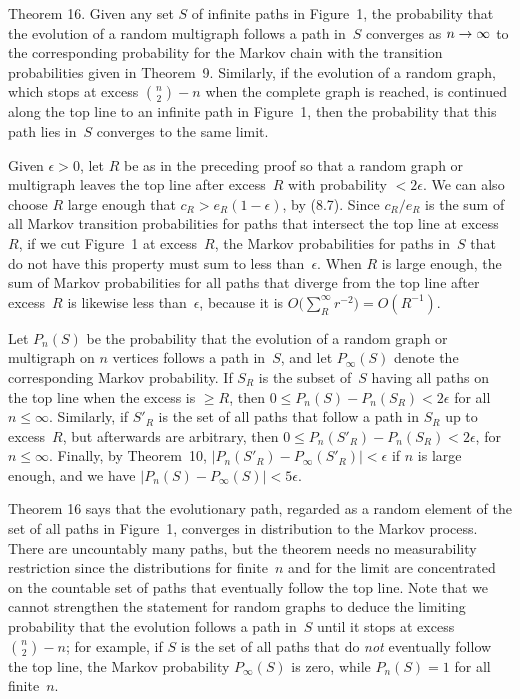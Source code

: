 \proclaim
Theorem 16.
Given any set $S$ of infinite paths in Figure~1, the probability that
the evolution of a random multigraph follows a path in~$S$ converges
as $n\rightarrow\infty$ to the corresponding probability for the Markov chain
with the transition probabilities given in Theorem~9.
Similarly, if the evolution of a random graph, which stops at excess
${n\choose2}-n$ when the complete graph is reached, is continued along
the top line to an infinite path in Figure~1, then the probability that
this path lies in~$S$ converges to the same limit.

\proof
Given $\epsilon >0$, let $R$ be as in the preceding proof so that a random
graph or multigraph leaves the top line after excess~$R$ with probability
$<2\epsilon$. We can also choose $R$ large enough that
$c_R>e_R(1-\epsilon)$, by (8.7). Since $c_R/e_R$ is the sum of all
Markov transition probabilities for paths that intersect the top line
at excess~$R$, if we cut Figure~1 at excess~$R$, the Markov
probabilities for paths in~$S$ that do not have this property must sum
to less than~$\epsilon$. When $R$ is large enough, the sum of Markov
probabilities for all paths that diverge from the top line after
excess~$R$ is likewise less than~$\epsilon$, because it
is $O\bigl(\sum_R^\infty r^{-2}\bigr)=O(R^{-1})$.

Let $P_n(S)$ be the probability that the evolution of a random graph or
multigraph on $n$ vertices follows a path in~$S$, and let $P_\infty(S)$
denote the corresponding Markov probability.
If $S_R$ is the subset of~$S$ having all paths on the top line
when the excess is $\geq R$, then $0\le P_n(S)-P_n(S_R)<2\epsilon$ for
all $n\le\infty$. Similarly, if $S'_R$ is the set of all paths that
follow a path in $S_R$ up to excess~$R$, but afterwards are arbitrary,
then $0\le P_n(S'_R)-P_n(S_R)<2\epsilon$, for $n\le\infty$.
Finally, by Theorem~10, $\bigl\vert P_n(S'_R)-P_\infty(S'_R)\bigr\vert
<\epsilon$ if $n$ is large enough, and we have
$\bigl\vert P_n(S)-P_\infty(S)\bigr\vert<5\epsilon$.\quad\pfbox

\medskip
Theorem 16 says that the evolutionary path, regarded as a random
element of the set of
all paths in Figure~1, converges in distribution to the Markov
process. There are uncountably many paths, but the theorem needs no
measurability restriction since the distributions for finite~$n$ and
for the limit are concentrated on the countable set of paths that
eventually follow the top line.
Note that we cannot strengthen the statement for random graphs
to deduce the limiting probability that the evolution follows a path
in~$S$ until it stops at excess~${n\choose2}-n$; for example, if
$S$ is the set of all paths that do {\it not\/} eventually follow
the top line, the Markov probability $P_\infty(S)$ is zero, while
$P_n(S)=1$ for all finite~$n$.

